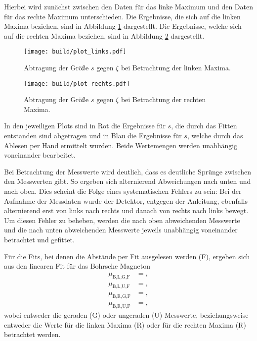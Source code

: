 Hierbei wird zunächst zwischen den Daten für das linke Maximum und den Daten für das rechte Maximum unterschieden.
Die Ergebnisse, die sich auf die linken Maxima beziehen, sind in Abbildung \ref{fig:plotlinks} dargestellt. Die Ergebnisse, welche sich auf die rechten Maxima beziehen, sind in Abbildung \ref{fig:plotrechts} dargestellt.
\begin{figure}
  \centering
  \texttt{[image: build/plot\_links.pdf]}
  \caption{Abtragung der Größe $s$ gegen $\zeta$ bei Betrachtung der linken Maxima.}
  \label{fig:plotlinks}
\end{figure}

\begin{figure}
  \centering
  \texttt{[image: build/plot\_rechts.pdf]}
  \caption{Abtragung der Größe $s$ gegen $\zeta$ bei Betrachtung der rechten Maxima.}
  \label{fig:plotrechts}
\end{figure}

In den jeweiligen Plots sind in Rot die Ergebnisse für $s$, die durch das Fitten entstanden sind abgetragen und in Blau die Ergebnisse für $s$, welche durch das Ablesen per Hand ermittelt wurden.
Beide Wertemengen werden unabhängig voneinander bearbeitet.

Bei Betrachtung der Messwerte wird deutlich, dass es deutliche Sprünge zwischen den Messwerten gibt.
So ergeben sich alternierend Abweichungen nach unten und nach oben.
Dies scheint die Folge eines systematischen Fehlers zu sein: Bei der Aufnahme der Messdaten wurde der Detektor, entgegen der Anleitung, ebenfalls alternierend erst von links nach rechts und danach von rechts nach links bewegt.
Um diesen Fehler zu beheben, werden die nach oben abweichenden Messwerte und die nach unten abweichenden Messwerte jeweils unabhängig voneinander betrachtet und gefittet.

Für die Fits, bei denen die Abstände per Fit ausgelesen werden (F), ergeben sich aus den linearen Fit für das Bohrsche Magneton
\begin{align*}
  \mu_{\text{B,L,G,F}} &= ,\\
  \mu_{\text{B,L,U,F}} &= ,\\
  \mu_{\text{B,R,G,F}} &= ,\\
  \mu_{\text{B,R,U,F}} &= ,
\end{align*}
wobei entweder die geraden (G) oder ungeraden (U) Messwerte, beziehungsweise entweder die Werte für die linken Maxima (R) oder für die rechten Maxima (R) betrachtet werden.

